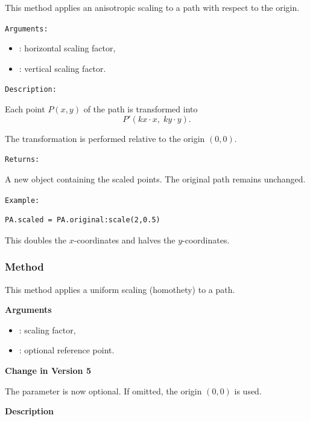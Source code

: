 This method applies an anisotropic scaling to a path with respect to the origin.

\medskip

\texttt{Arguments: }
\begin{itemize}
  \item {} : horizontal scaling factor,
  \item {} : vertical scaling factor.
\end{itemize}

\medskip

\texttt{Description: }

Each point $P(x,y)$ of the path is transformed into
\[
P'(kx \cdot x,\; ky \cdot y).
\]

The transformation is performed relative to the origin $(0,0)$.

\medskip

\texttt{Returns: }

A new  object containing the scaled points.
The original path remains unchanged.

\medskip

\texttt{Example: }

\begin{verbatim}
PA.scaled = PA.original:scale(2,0.5)
\end{verbatim}

This doubles the $x$-coordinates and halves the $y$-coordinates.

\subsubsection{Method }
\label{ssub:path_homothety}

This method applies a uniform scaling (homothety) to a path.

\medskip

\textbf{Arguments}
\begin{itemize}
  \item {} : scaling factor,
  \item {} : optional reference point.
\end{itemize}

\medskip

\textbf{Change in Version 5}

The  parameter is now optional.
If omitted, the origin $(0,0)$ is used.

\medskip

\textbf{Description}

